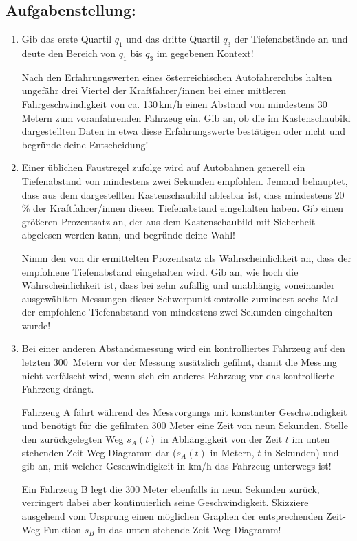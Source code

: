 \begin{langesbeispiel}
\subsection{Aufgabenstellung:}
\begin{enumerate}
	\item {} Gib das erste Quartil $q_1$ und das dritte Quartil $q_3$ der Tiefenabstände an und deute den Bereich von $q_1$ bis $q_3$ im gegebenen Kontext!
	
	Nach den Erfahrungswerten eines österreichischen Autofahrerclubs halten ungefähr drei Viertel der Kraftfahrer/innen bei einer mittleren Fahrgeschwindigkeit von ca. 130\,km/h einen Abstand von mindestens 30 Metern zum voranfahrenden Fahrzeug ein. Gib an, ob die im Kastenschaubild dargestellten Daten in etwa diese Erfahrungswerte bestätigen oder nicht und begründe deine Entscheidung!
	
	\item Einer üblichen Faustregel zufolge wird auf Autobahnen generell ein Tiefenabstand von mindestens zwei Sekunden empfohlen. Jemand behauptet, dass aus dem dargestellten Kastenschaubild ablesbar ist, dass mindestens 20\,\% der Kraftfahrer/innen diesen Tiefenabstand eingehalten haben. Gib einen größeren Prozentsatz an, der aus dem Kastenschaubild mit Sicherheit abgelesen werden kann, und begründe deine Wahl!
	
Nimm den von dir ermittelten Prozentsatz als Wahrscheinlichkeit an, dass der empfohlene Tiefenabstand eingehalten wird. Gib an, wie hoch die Wahrscheinlichkeit ist, dass bei zehn zufällig und unabhängig voneinander ausgewählten Messungen dieser Schwerpunktkontrolle zumindest sechs Mal der empfohlene Tiefenabstand von mindestens zwei Sekunden eingehalten wurde!

\item Bei einer anderen Abstandsmessung wird ein kontrolliertes Fahrzeug auf den letzten 300 Metern vor der Messung zusätzlich gefilmt, damit die Messung nicht verfälscht wird, wenn sich ein anderes Fahrzeug vor das kontrollierte Fahrzeug drängt.

Fahrzeug A fährt während des Messvorgangs mit konstanter Geschwindigkeit und benötigt für die gefilmten 300 Meter eine Zeit von neun Sekunden. Stelle den zurückgelegten Weg $s_A(t)$ in Abhängigkeit von der Zeit $t$ im unten stehenden Zeit-Weg-Diagramm dar ($s_A(t)$ in
Metern, $t$ in Sekunden) und gib an, mit welcher Geschwindigkeit in km/h das Fahrzeug unterwegs ist!

Ein Fahrzeug B legt die 300 Meter ebenfalls in neun Sekunden zurück, verringert dabei aber kontinuierlich seine Geschwindigkeit. Skizziere ausgehend vom Ursprung einen möglichen Graphen der entsprechenden Zeit-Weg-Funktion $s_B$ in das unten stehende Zeit-Weg-Diagramm!\leer


\end{enumerate}
\end{langesbeispiel}
